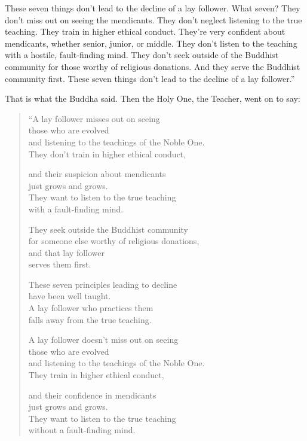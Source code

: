 \documentclass[12pt,openany]{book}%
\begin{document}
These seven things don’t lead to the decline of a lay follower. What seven? They don’t miss out on seeing the mendicants. They don’t neglect listening to the true teaching. They train in higher ethical conduct. They’re very confident about mendicants, whether senior, junior, or middle. They don’t listen to the teaching with a hostile, fault-finding mind. They don’t seek outside of the Buddhist community for those worthy of religious donations. And they serve the Buddhist community first. These seven things don’t lead to the decline of a lay follower.” 

That is what the Buddha said. Then the Holy One, the Teacher, went on to say: 

\begin{verse}%
“A lay follower misses out on seeing \\
those who are evolved \\
and listening to the teachings of the Noble One. \\
They don’t train in higher ethical conduct, 

and their suspicion about mendicants \\
just grows and grows. \\
They want to listen to the true teaching \\
with a fault-finding mind. 

They seek outside the Buddhist community \\
for someone else worthy of religious donations, \\
and that lay follower \\
serves them first. 

These seven principles leading to decline \\
have been well taught. \\
A lay follower who practices them \\
falls away from the true teaching. 

A lay follower doesn’t miss out on seeing \\
those who are evolved \\
and listening to the teachings of the Noble One. \\
They train in higher ethical conduct, 

and their confidence in mendicants \\
just grows and grows. \\
They want to listen to the true teaching \\
without a fault-finding mind. 


\end{verse}
\end{document}
